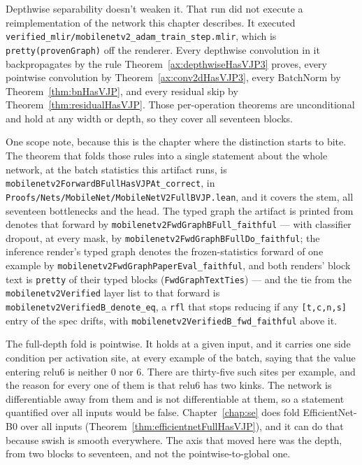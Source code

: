 Depthwise separability doesn't weaken it. That run did not execute a
reimplementation of the network this chapter describes. It executed
\texttt{verified\_mlir/mobilenetv2\_adam\_train\_step.mlir}, which is
\texttt{pretty(provenGraph)} off the renderer. Every depthwise
convolution in it backpropagates by the rule
Theorem~\ref{ax:depthwiseHasVJP3} proves, every pointwise convolution by Theorem~\ref{ax:conv2dHasVJP3}, every
BatchNorm by Theorem~\ref{thm:bnHasVJP}, and every residual skip by
Theorem~\ref{thm:residualHasVJP}. Those per-operation theorems are unconditional and hold at any
width or depth, so they cover all seventeen blocks.

One scope note, because this is the chapter where the distinction starts
to bite. The theorem that folds those rules into a single statement about
the whole network, at the batch statistics this artifact runs, is
\texttt{mobilenetv2ForwardBFullHasVJPAt\_correct}, in
\texttt{Proofs/Nets/MobileNet/MobileNetV2FullBVJP.lean}, and it covers the
stem, all seventeen bottlenecks and the head. The typed graph the artifact
is printed from denotes that forward by
\texttt{mobilenetv2FwdGraphBFull\_faithful} --- with classifier dropout, at
every mask, by \texttt{mobilenetv2FwdGraphBFullDo\_faithful}; the inference
render's typed graph denotes the frozen-statistics forward of one example by
\texttt{mobilenetv2FwdGraphPaperEval\_faithful}, and both renders' block text
is \texttt{pretty} of their typed blocks (\texttt{FwdGraphTextTies}) --- and
the tie from the
\texttt{mobilenetv2Verified} layer list to that forward is
\texttt{mobilenetv2VerifiedB\_denote\_eq}, a \texttt{rfl} that stops
reducing if any \texttt{[t,c,n,s]} entry of the spec drifts, with
\texttt{mobilenetv2VerifiedB\_fwd\_faithful} above it.

The full-depth fold is pointwise. It holds at a given input, and
it carries one side condition per activation site, at every example of
the batch, saying that the value entering relu6 is neither $0$ nor $6$.
There are thirty-five such sites per example,
and the reason for every one of them is that relu6 has two kinks. The
network is differentiable away from them and is not differentiable at
them, so a statement quantified over all inputs would be false.
Chapter~\ref{chap:se} does fold EfficientNet-B0 over all inputs
(Theorem~\ref{thm:efficientnetFullHasVJP}), and it can do that because swish
is smooth everywhere. The axis that moved here was the depth, from
two blocks to seventeen, and not the pointwise-to-global one.

